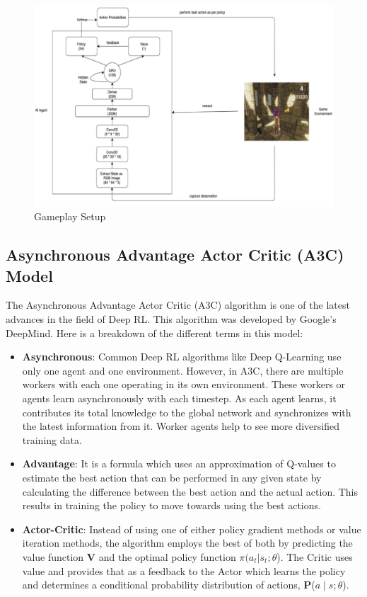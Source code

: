 \documentclass[conference]{IEEEtran}
\begin{document}
\begin{figure}
  \includegraphics[width=\textwidth]{gameplay.png}
  \caption{Gameplay Setup}
  \label{gameplay_setup}
\end{figure}

\subsection{\textbf{Asynchronous Advantage Actor Critic (A3C) Model}}
The Asynchronous Advantage Actor Critic (A3C) \cite{Mnih-et-al-2016} algorithm is one of the latest advances in the field of Deep RL. This algorithm was developed by Google’s DeepMind. Here is a breakdown of the different terms in this model:

\begin{itemize}
	\item \textbf{Asynchronous}: Common Deep RL algorithms like Deep Q-Learning use only one agent and one environment. However, in A3C, there are multiple workers with each one operating in its own environment. These workers or agents learn asynchronously with each timestep. As each agent learns, it contributes its total knowledge to the global network and synchronizes with the latest information from it. Worker agents help to see more diversified training data. 

	\item \textbf{Advantage}: It is a formula which uses an approximation of Q-values to estimate the best action that can be performed in any given state by calculating the difference between the best action and the actual action. This results in training the policy to move towards using the best actions.

	\item \textbf{Actor-Critic}: Instead of using one of either policy gradient methods or value iteration methods, the algorithm employs the best of both by predicting the value function \textbf{V} and the optimal policy function $\pi(a_t|s_t; \theta$). The Critic uses value and provides that as a feedback to the Actor which learns the policy and determines a conditional probability distribution of actions, \textbf{P}($a \mid s; \theta$).

\end{itemize}
\end{document}
